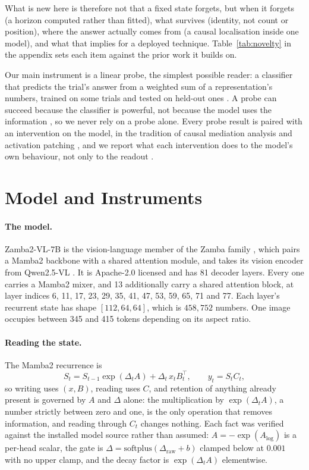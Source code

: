 What is new here is therefore not that a fixed state forgets, but when it
forgets (a horizon computed rather than fitted), what survives (identity, not
count or position), where the answer actually comes from (a causal
localisation inside one model), and what that implies for a deployed
technique. Table~\ref{tab:novelty} in the appendix sets each item against the
prior work it builds on.

Our main instrument is a linear probe, the simplest possible reader: a
classifier that predicts the trial's answer from a weighted sum of a
representation's numbers, trained on some trials and tested on held-out ones
\citep{alain2016probes}. A probe can succeed because the classifier is
powerful, not because the model uses the information
\citep{hewitt2019control,belinkov2022probing}, so we never rely on a probe
alone. Every probe result is paired with an intervention on the model, in the
tradition of causal mediation analysis \citep{vig2020causal} and activation
patching \citep{meng2022rome,wang2022ioi}, and we report what each
intervention does to the model's own behaviour, not only to the readout
\citep{zhang2024patching}.

\section{Model and Instruments}

\paragraph{The model.} Zamba2-VL-7B \citep{zamba2vl} is the vision-language
member of the Zamba family \citep{glorioso2024zamba}, which pairs a Mamba2
backbone \citep{dao2024mamba2} with a shared attention module, and takes its
vision encoder from Qwen2.5-VL \citep{bai2025qwen25vl}. It is Apache-2.0
licensed and has 81 decoder layers. Every one carries a Mamba2 mixer, and 13
additionally carry a shared attention block, at layer indices 6, 11, 17, 23, 29,
35, 41, 47, 53, 59, 65, 71 and 77. Each layer's recurrent state has shape
$[112, 64, 64]$, which is $458{,}752$ numbers. One image occupies between 345
and 415 tokens depending on its aspect ratio.

\paragraph{Reading the state.} The Mamba2 recurrence is
\begin{equation}
S_t = S_{t-1}\exp(\Delta_t A) + \Delta_t\, x_t B_t^{\top},
\qquad y_t = S_t C_t ,
\end{equation}
so writing uses $(x, B)$, reading uses $C$, and retention of anything already
present is governed by $A$ and $\Delta$ alone: the multiplication by
$\exp(\Delta_t A)$, a number strictly between zero and one, is the only
operation that removes information, and reading through $C_t$ changes nothing.
Each fact was verified against the installed model source rather than assumed:
$A = -\exp(A_{\log})$ is a per-head scalar, the gate is
$\Delta = \mathrm{softplus}(\Delta_{\text{raw}} + b)$ clamped below at
$0.001$ with no upper clamp, and the decay factor is $\exp(\Delta_t A)$
elementwise.

